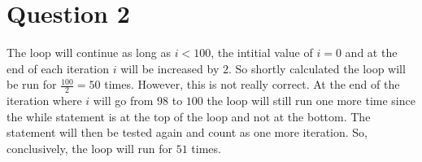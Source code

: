 \section{Question 2}

    The loop will continue as long as $i<100$, the intitial value of $i = 0$ and at the end of each iteration $i$ will be increased by $2$. So shortly calculated the loop will be run for $\frac{100}{2} = 50$ times. However, this is not really correct. At the end of the iteration where $i$ will go from $98$ to $100$ the loop will still run one more time since the while statement is at the top of the loop and not at the bottom. The statement will then be tested again and count as one more iteration. So, conclusively, the loop will run for $51$ times.